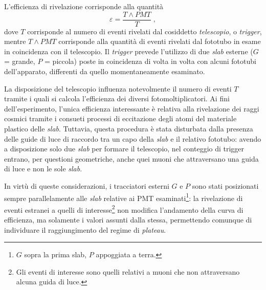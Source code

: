 \documentclass[10pt, oneside, a4paper]{article}   	%
\begin{document}
L'efficienza di rivelazione corrisponde alla quantità
\[\varepsilon = \frac{T\wedge PMT}{T}\;,\]
dove $T$ corrisponde al numero di eventi rivelati dal cosiddetto \textit{telescopio}, o \textit{trigger}, mentre $T\wedge PMT$ corrisponde alla quantità di eventi rivelati dal fototubo in esame in coincidenza con il telescopio. Il \emph{trigger} prevede l'utilizzo di due \emph{slab} esterne \linebreak ($G$ = grande, $P$ = piccola) poste in coincidenza di volta in volta con alcuni fototubi dell'apparato, differenti da quello momentaneamente esaminato. 

La disposizione del telescopio influenza notevolmente il numero di eventi $T$ tramite i quali si calcola l'efficienza dei diversi fotomoltiplicatori. Ai fini dell'esperimento, l'unica efficienza interessante è relativa alla rivelazione dei raggi cosmici tramite i consueti processi di eccitazione degli atomi del materiale plastico delle \emph{slab}. Tuttavia, questa procedura è stata disturbata dalla presenza delle guide di luce di raccordo tra un capo della \emph{slab} e il relativo fototubo: avendo a disposizione solo due \emph{slab} per formare il telescopio, nel conteggio di trigger entrano, per questioni geometriche, anche quei muoni che attraversano una guida di luce e non le sole \emph{slab}.

In virtù di queste considerazioni, i tracciatori esterni $G$ e $P$ sono stati posizionati sempre parallelamente alle \emph{slab} relative ai PMT esaminati\footnote{$G$ sopra la prima slab, $P$ appoggiata a terra.}: la rivelazione di eventi estranei a quelli di interesse\footnote{Gli eventi di interesse sono quelli relativi a muoni che non attraversano alcuna guida di luce.} non modifica l'andamento della curva di efficienza, ma solamente i valori assunti dalla stessa, permettendo comunque di individuare il raggiungimento del regime di \emph{plateau}.
\end{document}

